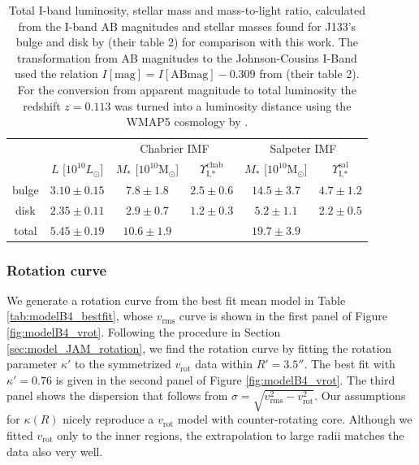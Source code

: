 \documentclass[useAMS,usenatbib]{mnras}
\begin{document}
\begin{table}
\centering
\caption{Total I-band luminosity, stellar mass and mass-to-light ratio, calculated from the I-band AB magnitudes and stellar masses found for J133's bulge and disk by \citet{SWELLSI} (their table 2) for comparison with this work. The transformation from AB magnitudes to the Johnson-Cousins I-Band used the relation $I[\text{mag}] = I[\text{ABmag}] - 0.309$ from \citet{FG1994} (their table 2). For the conversion from apparent magnitude to total luminosity the redshift $z=0.113$ \citet{SWELLSIII} was turned into a luminosity distance using the WMAP5 cosmology by \citet{WMAP5cosm}. }
\begin{tabular}{cccccc}
\hline\hline
& & \multicolumn{2}{c}{Chabrier IMF} & \multicolumn{2}{c}{Salpeter IMF}\\
      &  $L$ [$10^{10}L_{\odot}$]                & $M_*$ [$10^{10}\text{M}_\odot$]               & $\Upsilon_\text{I,*}^\text{chab}$ & $M_*$ [$10^{10}\text{M}_\odot$] & $\Upsilon_\text{I,*}^\text{sal}$ \\\hline
bulge &   $3.10 \pm 0.15 $  & $7.8 \pm 1.8$ & $2.5 \pm 0.6$ & $14.5 \pm 3.7 $ & $4.7 \pm 1.2$ \\
disk  &   $2.35 \pm 0.11 $  & $2.9 \pm 0.7$ & $1.2 \pm 0.3$ & $5.2 \pm 1.1$ & $2.2 \pm 0.5$ \\
total &   $5.45 \pm 0.19$ & $10.6 \pm 1.9$& & $19.7 \pm 3.9$&\\\hline
\end{tabular}
\label{tab:previousresults}
\end{table}

\subsubsection{Rotation curve}

We generate a rotation curve from the best fit mean model in Table \ref{tab:modelB4_bestfit}, whose $v_\text{rms}$ curve is shown in the first panel of Figure \ref{fig:modelB4_vrot}. Following the procedure in Section \ref{sec:model_JAM_rotation}, we find the rotation curve by fitting the rotation parameter $\kappa'$ to the symmetrized $v_\text{rot}$ data within $R' = 3.5''$. The best fit with $\kappa' = 0.76$ is given in the second panel of Figure \ref{fig:modelB4_vrot}. The third panel shows the dispersion that follows from $\sigma = \sqrt{v_\text{rms}^2 - v_\text{rot}^2}$. Our assumptions for $\kappa(R)$ nicely reproduce a $v_\text{rot}$ model with counter-rotating core. Although we fitted $v_\text{rot}$ only to the inner regions, the extrapolation to large radii matches the data also very well.
\end{document}
